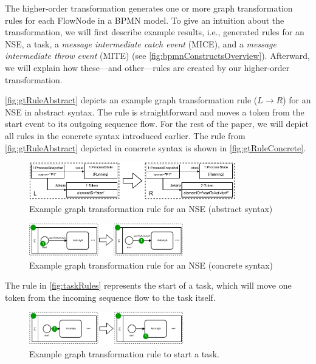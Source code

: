 \documentclass[runningheads]{llncs}
\begin{document}
The higher-order transformation generates one or more graph transformation rules for each \textsf{FlowNode} in a BPMN model.
To give an intuition about the transformation, we will first describe example results, i.e., generated rules for an NSE, a task, a \textit{message intermediate catch event} (MICE), and a \textit{message intermediate throw event} (MITE) (see \autoref{fig:bpmnConstructsOverview}).
Afterward, we will explain how these---and other---rules are created by our higher-order transformation.

\autoref{fig:gtRuleAbstract} depicts an example graph transformation rule ($L \to R$) for an NSE in abstract syntax.
The rule is straightforward and moves a token from the start event to its outgoing sequence flow.
For the rest of the paper, we will depict all rules in the concrete syntax introduced earlier.
The rule from \autoref{fig:gtRuleAbstract} depicted in concrete syntax is shown in \autoref{fig:gtRuleConcrete}.

\begin{figure}[ht]
    \centering
  \includegraphics[width=0.8\textwidth]{images/rule_abstract.pdf}
  \caption{Example graph transformation rule for an NSE (abstract syntax)}  \label{fig:gtRuleAbstract}
\end{figure}

\begin{figure}[ht]
    \centering
  \includegraphics[width=0.6\textwidth]{images/rule_concrete.pdf}
  \caption{Example graph transformation rule for an NSE (concrete syntax)}
  \label{fig:gtRuleConcrete}
\end{figure}

The rule in \autoref{fig:taskRules} represents the start of a task, which will move one token from the incoming sequence flow to the task itself.

\begin{figure}[ht]
    \centering
    \includegraphics[width=0.6\textwidth]{images/bpmn_semantics-rules.pdf}
    \caption{Example graph transformation rule to start a task.}
    \label{fig:taskRules}
\end{figure}
\end{document}
